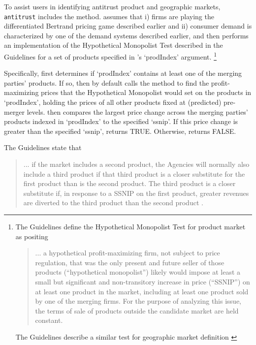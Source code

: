 \documentclass[11pt,numbers=noenddot,pointlessnumbers]{scrreprt}
\newcommand{\atr}{{\tt antitrust}}
\numberwithin{equation}{section}
\begin{document}
To assist users in identifying antitrust product and geographic markets, \atr{} includes the
\verb@HypoMonTest@ method. \verb@HypoMonTest@ assumes that i) firms
are playing the differentiated Bertrand pricing game described earlier
and ii) consumer demand is characterized by one of the demand systems
described earlier, and then performs an implementation of the
Hypothetical Monopolist Test described in the Guidelines for a  set of products specified in \verb@HypoMonTest@'s
`prodIndex' argument.
\footnote{The Guidelines define the Hypothetical Monopolist Test for product
market as positing

\begin{quote}
... a hypothetical profit-maximizing
firm, not subject to price regulation, that was the only present and
future seller of those products (“hypothetical monopolist”) likely
would impose at least a small but significant and non-transitory
increase in price (“SSNIP”) on at least one product in the market,
including at least one product sold by one of the merging firms. For
the purpose of analyzing this issue, the terms of sale of products
outside the candidate market are held constant. \cite[p.~9]{HMG2010}
\end{quote}

The Guidelines describe a similar test for geographic market
definition \cite[p.~13]{HMG2010}
}

Specifically, \verb@HypoMonTest@ first determines
if `prodIndex' contains at least one  of the merging parties'
products. If so,  then by default \verb@HypoMonTest@  calls the
\verb@calcPriceDeltaHypoMon@ method to find the profit-maximizing
prices that the Hypothetical Monopolist would set on the products in
`prodIndex', holding the prices of all other products fixed at
(predicted) pre-merger levels. \verb@HypoMonTest@ then compares the
largest price change across the merging parties' products indexed in
`prodIndex' to the specified `ssnip'. If this price change is
greater than the specified `ssnip',
\verb@HypoMonTest@ returns TRUE. Otherwise, \verb@HypoMonTest@ returns FALSE.

The Guidelines state that

\begin{quote}
  ... if the market includes a second product,
the Agencies will normally also include a third product if that third
product is a closer substitute for the first product than is the
second product. The third product is a closer substitute if, in
response to a SSNIP on the first product, greater revenues are
diverted to the third product than the second product  \cite[p.~9]{HMG2010}.
\end{quote}
\end{document}
